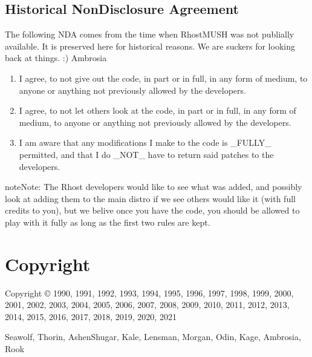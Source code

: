 \documentclass[letterpaper,10pt,english]{sphinxmanual}
\begin{document}
\section{Historical Non\sphinxhyphen{}Disclosure Agreement}
\label{\detokenize{nda:historical-non-disclosure-agreement}}\label{\detokenize{nda::doc}}
\sphinxAtStartPar
The following NDA comes from the time when RhostMUSH was not publially
available. It is preserved here for historical reasons. We are suckers for
looking back at things. :)
\textendash{}Ambrosia
\begin{enumerate}
%
\item {} 
\sphinxAtStartPar
I agree, to not give out the code, in part or in full, in any form of
medium, to anyone or anything not previously allowed by the developers.

\item {} 
\sphinxAtStartPar
I agree, to not let others look at the code, in part or in full, in
any form of medium, to anyone or anything not previously allowed by the
developers.

\item {} 
\sphinxAtStartPar
I am aware that any modifications I make to the code is \_FULLY\_
permitted, and that I do \_NOT\_ have to return said patches to the
developers.

\end{enumerate}

\begin{sphinxadmonition}{note}{Note:}
\sphinxAtStartPar
The Rhost developers would like to see what was added, and possibly
look at adding them to the main distro if we see others would like
it (with full credits to you), but we belive once you have the code,
you should be allowed to play with it fully as long as the first two
rules are kept.
\end{sphinxadmonition}


\chapter{Copyright}
\label{\detokenize{index:copyright}}
\sphinxAtStartPar
Copyright © 1990, 1991, 1992, 1993, 1994, 1995, 1996, 1997, 1998, 1999,
2000, 2001, 2002, 2003, 2004, 2005, 2006, 2007, 2008, 2009, 2010, 2011, 2012,
2013, 2014, 2015, 2016, 2017, 2018, 2019, 2020, 2021

\sphinxAtStartPar
Seawolf, Thorin, Ashen\sphinxhyphen{}Shugar, Kale, Lensman, Morgan, Odin, Kage, Ambrosia, Rook
\end{document}
